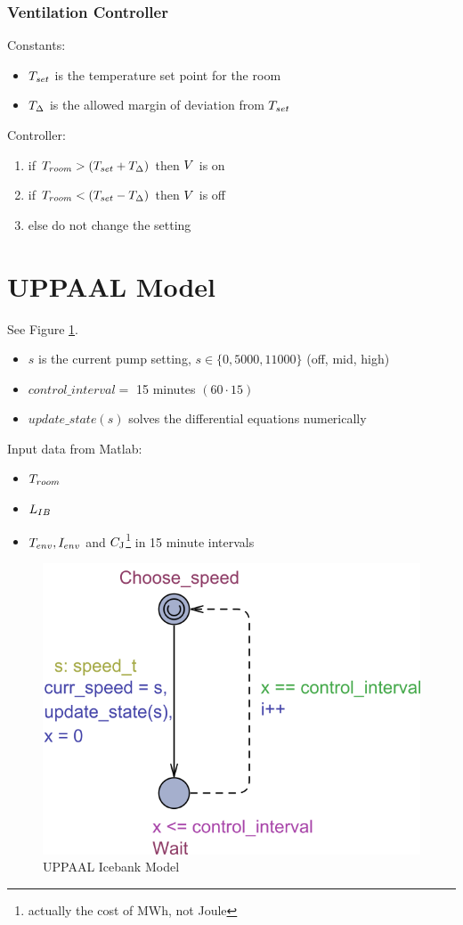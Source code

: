 \subsubsection{Ventilation Controller}
Constants:
\begin{itemize}
\item
  ${T_{set}}$ is the temperature set point for the room
\item
  ${T_{\Delta}}$ is the allowed margin of deviation from ${T_{set}}$
\end{itemize}

Controller:
\begin{enumerate}
\item
  if $T_{room} > ({T_{set}} + {T_{\Delta}})$ then $V$ is on
\item
  if $T_{room} < ({T_{set}} - {T_{\Delta}})$ then $V$ is off
\item
  else do not change the setting
\end{enumerate}

\section{UPPAAL Model}
See Figure \ref{fig:uppaal_model}.
\begin{itemize}
  \item $s$ is the current pump setting, $s \in \{0, 5000, 11000\}$ (off, mid, high)
	\item $control\_interval =$ 15 minutes $(60 \cdot 15)$
	\item $update\_state(s)$ solves the differential equations numerically
\end{itemize}
Input data from Matlab:

\begin{itemize}
	\item $T_{room}$
	\item $L_{IB}$
	\item $T_{env}, I_{env}$ and $C_{\si{\joule}}$\footnote{actually the cost of MWh, not Joule} in 15 minute intervals
\end{itemize}
\begin{figure}[htb]
	\centering
		\includegraphics[scale=0.5]{figures/uppaal_model.png}
	\caption{UPPAAL Icebank Model}
	\label{fig:uppaal_model}
\end{figure}

